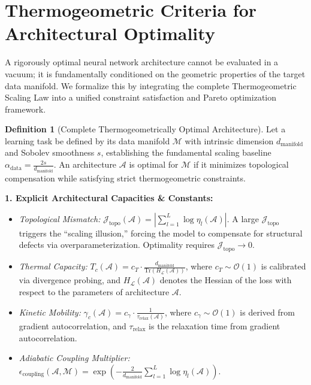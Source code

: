 \documentclass[11pt, a4paper]{article}
\theoremstyle{definition}
\newtheorem{definition}{Definition}[section]
\begin{document}
\section{Thermogeometric Criteria for Architectural Optimality}
\label{sec:architectural_optimality}

A rigorously optimal neural network architecture cannot be evaluated in a vacuum; it is fundamentally conditioned on the geometric properties of the target data manifold. We formalize this by integrating the complete Thermogeometric Scaling Law into a unified constraint satisfaction and Pareto optimization framework.

\begin{definition}[Complete Thermogeometrically Optimal Architecture]
\label{def:complete_optimal_arch}
Let a learning task be defined by its data manifold $\mathcal{M}$ with intrinsic dimension $d_{\text{manifold}}$ and Sobolev smoothness $s$, establishing the fundamental scaling baseline $\alpha_{\text{data}} = \frac{2s}{d_{\text{manifold}}}$. An architecture $\mathcal{A}$ is optimal for $\mathcal{M}$ if it minimizes topological compensation while satisfying strict thermogeometric constraints.

\textbf{1. Explicit Architectural Capacities \& Constants:}
\begin{itemize}
 \item \emph{Topological Mismatch:} $\mathcal{J}_{\text{topo}}(\mathcal{A}) = \left| \sum_{l=1}^L \log \eta_l(\mathcal{A}) \right|$. A large $\mathcal{J}_{\text{topo}}$ triggers the ``scaling illusion,'' forcing the model to compensate for structural defects via overparameterization. Optimality requires $\mathcal{J}_{\text{topo}} \to 0$.
 \item \emph{Thermal Capacity:} $T_c(\mathcal{A}) = c_T \cdot \frac{d_{\text{manifold}}}{\text{Tr}(H_{\mathcal{L}}(\mathcal{A}))}$, where $c_T \sim \mathcal{O}(1)$ is calibrated via divergence probing, and $H_{\mathcal{L}}(\mathcal{A})$ denotes the Hessian of the loss with respect to the parameters of architecture $\mathcal{A}$.
 \item \emph{Kinetic Mobility:} $\gamma_c(\mathcal{A}) = c_\gamma \cdot \frac{1}{\tau_{\text{relax}}(\mathcal{A})}$, where $c_\gamma \sim \mathcal{O}(1)$ is derived from gradient autocorrelation, and $\tau_{\text{relax}}$ is the relaxation time from gradient autocorrelation.
 \item \emph{Adiabatic Coupling Multiplier:} $\epsilon_{\text{coupling}}(\mathcal{A}, \mathcal{M}) = \exp\left( -\frac{2}{d_{\text{manifold}}} \sum_{l=1}^L \log \eta_l(\mathcal{A}) \right)$.
\end{itemize}


\end{definition}
\end{document}

